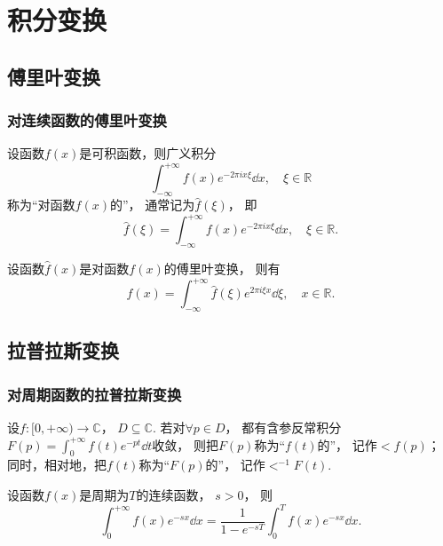 \chapter{积分变换}
\section{傅里叶变换}
\subsection{对连续函数的傅里叶变换}
\begin{definition}
设函数\(f(x)\)是可积函数，则广义积分\begin{equation*}
	\int_{-\infty}^{+\infty}
	f(x) e^{-2 \pi i x \xi}
	\dd{x},
	\quad \xi \in \mathbb{R}
\end{equation*}
称为“对函数\(f(x)\)的”，
通常记为\(\hat{f}(\xi)\)，
即\begin{equation*}
	\hat{f}(\xi)
	= \int_{-\infty}^{+\infty} f(x) e^{-2 \pi i x \xi} \dd{x},
	\quad \xi \in \mathbb{R}.
\end{equation*}
\end{definition}

\begin{theorem}
设函数\(\hat{f}(x)\)是对函数\(f(x)\)的傅里叶变换，
则有\begin{equation*}
	f(x)
	= \int_{-\infty}^{+\infty}
	\hat{f}(\xi) e^{2 \pi i \xi x} \dd{\xi},
	\quad x \in \mathbb{R}.
\end{equation*}
\end{theorem}

\section{拉普拉斯变换}
\subsection{对周期函数的拉普拉斯变换}
\begin{definition}
设\(f\colon[0,+\infty)\to\mathbb{C}\)，
\(D\subseteq\mathbb{C}\).
若对\(\forall p \in D\)，
都有含参反常积分\(F(p)=\int_0^{+\infty} f(t) e^{-pt} \dd{t}\)收敛，
则把\(F(p)\)称为“\(f(t)\)的”，
记作\(\lt f(p)\)；
同时，相对地，把\(f(t)\)称为“\(F(p)\)的”，
记作\(\lt^{-1} F(t)\).
\end{definition}

\begin{theorem}
设函数\(f(x)\)是周期为\(T\)的连续函数，
\(s>0\)，
则\begin{equation*}
	\int_0^{+\infty} f(x) e^{-sx} \dd{x}
	= \frac1{1-e^{-sT}}
	\int_0^T f(x) e^{-sx} \dd{x}.
\end{equation*}
\end{theorem}
